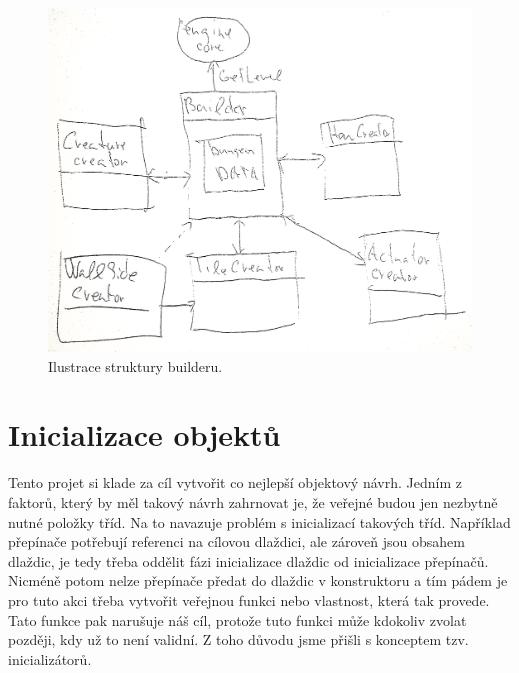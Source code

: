\begin{figure}[H]\centering
\includegraphics[width=\textwidth]{./img/sub-builders.png}
\caption{Ilustrace struktury builderu.}
\label{sub-builders}
\end{figure}


\section{Inicializace objektů}\label{level-inicialization}

Tento projet si klade za cíl vytvořit co nejlepší objektový návrh. Jedním z faktorů, který by měl takový návrh
zahrnovat je, že veřejné budou jen nezbytně nutné položky tříd. Na to navazuje problém s inicializací takových tříd. 
Například přepínače potřebují referenci na cílovou dlaždici, ale zároveň jsou obsahem dlaždic, je tedy třeba oddělit fázi inicializace 
dlaždic od inicializace přepínačů. Nicméně potom nelze přepínače předat do dlaždic v konstruktoru a tím pádem je pro tuto akci třeba 
vytvořit veřejnou funkci nebo vlastnost, která tak provede. Tato funkce pak narušuje náš cíl, protože tuto funkci může kdokoliv
zvolat později, kdy už to není validní. Z toho důvodu jsme přišli s konceptem tzv. inicializátorů.

